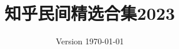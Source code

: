 \documentclass[11pt,a4paper]{report}
\title{知乎民间精选合集2023}
\author{}
\date{Version \today}
\begin{document}
\begin{titlepage}
    \maketitle
\end{titlepage}
\tableofcontents\clearpage


\end{document}
